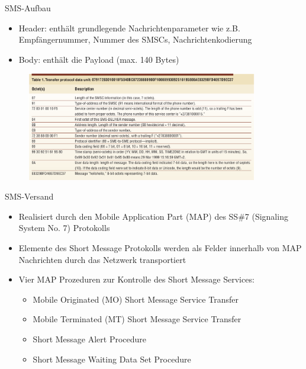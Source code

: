 \documentclass{beamer}
\begin{document}
\begin{frame}{SMS-Aufbau}
	\begin{itemize}
		\item Header: enthält grundlegende Nachrichtenparameter wie z.B. 
			Empfängernummer, Nummer des SMSCs, Nachrichtenkodierung
		\item Body: enthält die Payload (max. 140 Bytes)
	\end{itemize}
	\begin{figure}[htm]
		\includegraphics[width=0.9\textwidth]{img/tpdu-example.png}
		\label{tpdu-example}
	\end{figure}
\end{frame}

\begin{frame}{SMS-Versand}
	\begin{itemize}
		\item Realisiert durch den Mobile Application Part (MAP) des SS\#7 
			(Signaling System No. 7) Protokolls 
		\item Elemente des Short Message Protokolls werden als Felder innerhalb 
			von MAP Nachrichten durch das Netzwerk transportiert
		\item Vier MAP Prozeduren zur Kontrolle des Short Message Services:
			\begin{itemize}
				\item Mobile Originated (MO) Short Message Service Transfer
				\item Mobile Terminated (MT) Short Message Service Transfer
				\item Short Message Alert Procedure
				\item Short Message Waiting Data Set Procedure
			\end{itemize}
	\end{itemize}
\end{frame}
\end{document}
